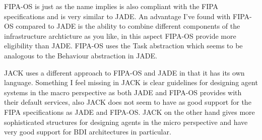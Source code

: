 \documentclass[paper=letter, fontsize=12pt]{article}
\begin{document}
FIPA-OS is just as the name implies is also compliant with the FIPA specifications and is very similar to JADE. An advantage I've found with FIPA-OS compared to JADE is the ability to combine different components of the infrastructure archticture as you like, in this aspect FIPA-OS provide more eligibility than JADE. FIPA-OS uses the Task abstraction which seems to be analogous to the Behaviour abstraction in JADE.

JACK uses a different approach to FIPA-OS and JADE in that it has its own language. Something I feel missing in JACK is clear guidelines for designing agent systems in the macro perspective as both JADE and FIPA-OS provides with their default services, also JACK does not seem to have as good support for the FIPA specifications as JADE and FIPA-OS. JACK on the other hand gives more sophisticated structures for designing agents in the micro perspective and have very good support for BDI architectures in particular.
{}

\end{document}
